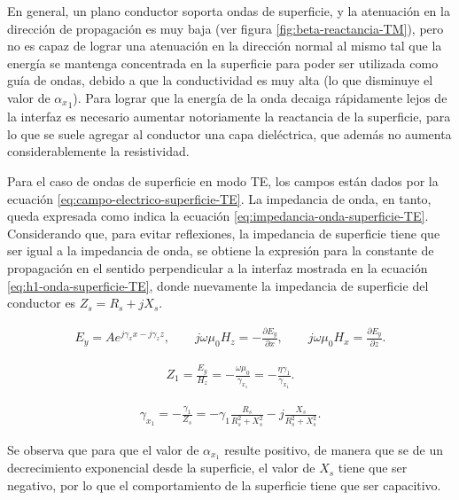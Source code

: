 En general, un plano conductor soporta ondas de superficie, y la atenuación en la dirección de propagación es muy baja (ver figura \ref{fig:beta-reactancia-TM}), pero no es capaz de lograr una atenuación en la dirección normal al mismo tal que la energía se mantenga concentrada en la superficie para poder ser utilizada como guía de ondas, debido a que la conductividad es muy alta (lo que disminuye el valor de ${\alpha_x}_1$). Para lograr que la energía de la onda decaiga rápidamente lejos de la interfaz es necesario aumentar notoriamente la reactancia de la superficie, para lo que se suele agregar al conductor una capa dieléctrica, que además no aumenta considerablemente la resistividad.

Para el caso de ondas de superficie en modo TE, los campos están dados por la ecuación \ref{eq:campo-electrico-superficie-TE}. La impedancia de onda, en tanto, queda expresada como indica la ecuación \ref{eq:impedancia-onda-superficie-TE}. Considerando que, para evitar reflexiones, la impedancia de superficie tiene que ser igual a la impedancia de onda, se obtiene la expresión para la constante de propagación en el sentido perpendicular a la interfaz mostrada en la ecuación \ref{eq:h1-onda-superficie-TE}, donde nuevamente la impedancia de superficie del conductor es $Z_s = R_s +jX_s$.

\begin{equation}
	\label{eq:campo-electrico-superficie-TE}
	\begin{aligned}
		E_y = A e^{j\gamma_x x-j\gamma_z z}, \qquad j\omega \mu_0 H_z = -\frac{\partial E_y}{\partial x}, \qquad j\omega \mu_0 H_x = \frac{\partial E_y}{\partial z}.
	\end{aligned}
\end{equation}

\begin{align}
	\label{eq:impedancia-onda-superficie-TE}
	Z_1 = \frac{E_y}{H_z} = -\frac{\omega \mu_0}{\gamma_{x_1}} = -\frac{\eta \gamma_1}{\gamma_{x_1}}.
\end{align}

\begin{align}
	\label{eq:h1-onda-superficie-TE}
	\gamma_{x_1} = -\frac{\gamma_1}{Z_s} = -\gamma_1 \frac{R_s}{{R_s^2 + X_s^2}}-j\frac{X_s}{R_s^2 + X_s^2}.
\end{align}

Se observa que para que el valor de $\alpha_{x_1}$ resulte positivo, de manera que se de un decrecimiento exponencial desde la superficie, el valor de $X_s$ tiene que ser negativo, por lo que el comportamiento de la superficie tiene que ser capacitivo.


